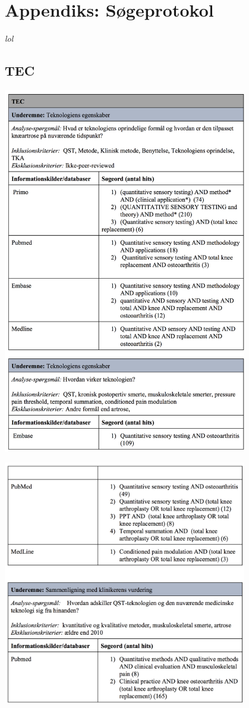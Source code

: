 \chapter{Appendiks: Søgeprotokol} \vspace{-.75cm}
\textit{lol}
\section{TEC}\label{TEC_sog}
\begin{center}
\includegraphics[width=0.8\textwidth]{rapportAfsnit/qBilag/sogninger/TEC1}

\includegraphics[width=0.8\textwidth]{rapportAfsnit/qBilag/sogninger/TEC2}
\end{center}

